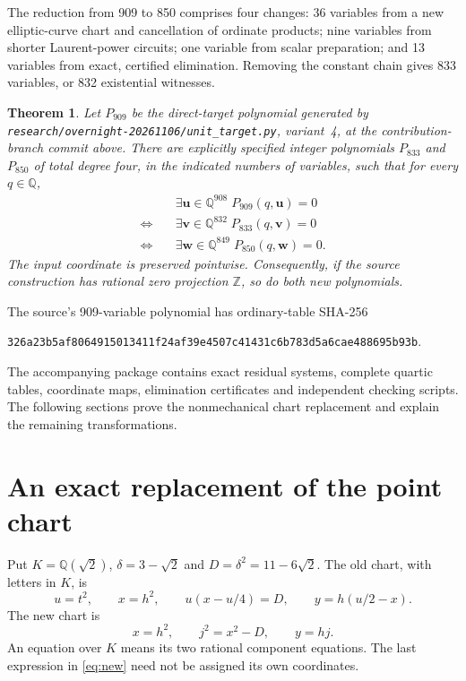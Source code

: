 \documentclass[11pt]{article}
\newtheorem{theorem}{Theorem}
\newcommand{\Q}{\mathbb Q}
\newcommand{\Z}{\mathbb Z}
\begin{document}
The reduction from 909 to 850 comprises four changes: 36 variables from a new elliptic-curve chart and cancellation of ordinate products; nine variables from shorter Laurent-power circuits; one variable from scalar preparation; and 13 variables from exact, certified elimination. Removing the constant chain gives 833 variables, or 832 existential witnesses.

\begin{theorem}\label{thm:main}
Let $P_{909}$ be the direct-target polynomial generated by
\nolinkurl{research/overnight-20261106/unit_target.py}, variant~4, at the contribution-branch commit above. There are explicitly specified integer polynomials $P_{833}$ and $P_{850}$ of total degree four, in the indicated numbers of variables, such that for every $q\in\Q$,
\[
 \begin{aligned}
 &\exists\mathbf u\in\Q^{908}\;P_{909}(q,\mathbf u)=0\\
 \Longleftrightarrow\quad&\exists\mathbf v\in\Q^{832}\;P_{833}(q,\mathbf v)=0\\
 \Longleftrightarrow\quad&\exists\mathbf w\in\Q^{849}\;P_{850}(q,\mathbf w)=0.
 \end{aligned}
\]
The input coordinate is preserved pointwise. Consequently, if the source construction has rational zero projection $\Z$, so do both new polynomials.
\end{theorem}

The source's 909-variable polynomial has ordinary-table SHA-256
\begin{center}\small\texttt{326a23b5af8064915013411f24af39e4507c41431c6b783d5a6cae488695b93b}.\end{center}
The accompanying package contains exact residual systems, complete quartic tables, coordinate maps, elimination certificates and independent checking scripts. The following sections prove the nonmechanical chart replacement and explain the remaining transformations.

\section{An exact replacement of the point chart}
Put $K=\Q(\sqrt2)$, $\delta=3-\sqrt2$ and $D=\delta^2=11-6\sqrt2$. The old chart, with letters in $K$, is
\begin{equation}\label{eq:old}
 u=t^2,\qquad x=h^2,\qquad u(x-u/4)=D,\qquad y=h(u/2-x).
\end{equation}
The new chart is
\begin{equation}\label{eq:new}
 x=h^2,\qquad j^2=x^2-D,\qquad y=hj.
\end{equation}
An equation over $K$ means its two rational component equations. The last expression in \eqref{eq:new} need not be assigned its own coordinates.
\end{document}
